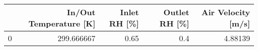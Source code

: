 \begin{tabular}{lrrrr}
\toprule
{} &  In/Out Temperature [K] &  Inlet RH [\%] &  Outlet RH [\%] &  Air Velocity [m/s] \\
\midrule
0 &              299.666667 &          0.65 &            0.4 &             4.88139 \\
\bottomrule
\end{tabular}

